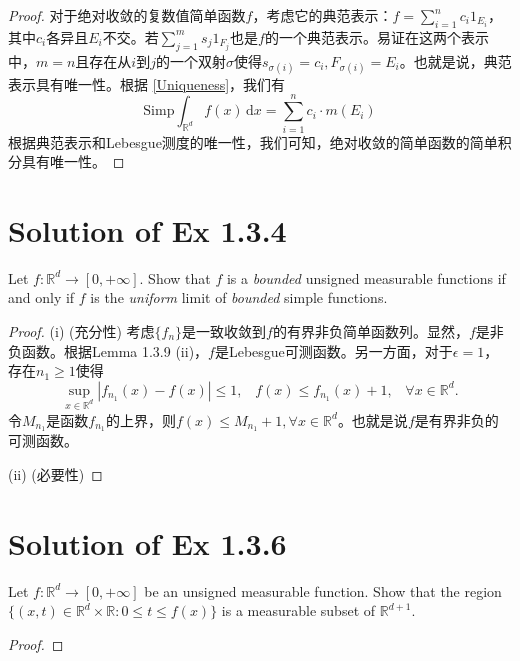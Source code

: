 \documentclass[reqno,a4paper,14pt]{amsart}
\newcommand\dif{\,\mathrm{d}}
\newcommand{\abs}[1]{\left\vert#1\right\vert}
\begin{document}
\begin{proof}
    对于绝对收敛的复数值简单函数$f$，考虑它的典范表示：$f=\sum_{i=1}^n c_i 1_{E_i}$，其中$c_i$各异且$E_i$不交。若$\sum_{j=1}^m s_j 1_{F_j}$也是$f$的一个典范表示。易证在这两个表示中，$m=n$且存在从$i$到$j$的一个双射$\sigma$使得$s_{\sigma(i)}=c_i, F_{\sigma(i)}=E_i$。也就是说，典范表示具有唯一性。根据 \eqref{Uniqueness}，我们有
    \begin{equation*}
        \mathrm{Simp}\int_{\mathbb{R}^d}  f(x)\dif x = \sum_{i=1}^n c_i \cdot m(E_i)
    \end{equation*}
    根据典范表示和Lebesgue测度的唯一性，我们可知，绝对收敛的简单函数的简单积分具有唯一性。
\end{proof}



\section{Solution of Ex 1.3.4}
Let $f: \mathbb{R}^d\to [0,+\infty]$. Show that $f$ is a \textit{bounded} unsigned measurable functions if and only if $f$ is the \textit{uniform} limit of \textit{bounded} simple functions.
\begin{proof}
    (i) (充分性) 考虑$\{f_n\}$是一致收敛到$f$的有界非负简单函数列。显然，$f$是非负函数。根据Lemma 1.3.9 (ii)，$f$是Lebesgue可测函数。另一方面，对于$\epsilon=1$，存在$n_1\geq 1$使得
    \begin{equation*}
        \sup_{x\in\mathbb{R}^d}\abs{f_{n_1}(x)-f(x)}\leq 1,\;\;\; f(x)\leq f_{n_1}(x)+1,\;\;\; \forall x\in\mathbb{R}^d.
    \end{equation*}
    令$M_{n_1}$是函数$f_{n_1}$的上界，则$f(x)\leq M_{n_1}+1, \forall x\in\mathbb{R}^d$。也就是说$f$是有界非负的可测函数。

    (ii) (必要性) 
\end{proof}

\section{Solution of Ex 1.3.6}
Let $f: \mathbb{R}^d\to [0,+\infty]$ be an unsigned measurable function. Show that the region $\{(x,t)\in \mathbb{R}^d\times \mathbb{R} : 0\leq t\leq f(x)\}$ is a measurable subset of $\mathbb{R}^{d+1}$. 
\begin{proof}
    
\end{proof}
\end{document}
